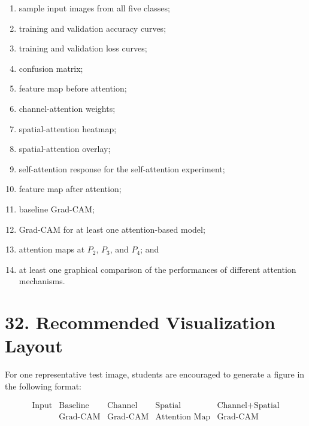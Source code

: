\documentclass[10pt]{article}
\begin{document}
\begin{enumerate}

\item sample input images from all five classes;

\item training and validation accuracy curves;

\item training and validation loss curves;

\item confusion matrix;

\item feature map before attention;

\item channel-attention weights;

\item spatial-attention heatmap;

\item spatial-attention overlay;

\item self-attention response for the self-attention experiment;

\item feature map after attention;

\item baseline Grad-CAM;

\item Grad-CAM for at least one attention-based model;

\item attention maps at $P_2$, $P_3$, and $P_4$; and

\item at least one graphical comparison of the performances of different
attention mechanisms.

\end{enumerate}

\section*{32. Recommended Visualization Layout}

For one representative test image, students are encouraged to generate a
figure in the following format:

\[
\boxed{
\begin{array}{ccccc}
\text{Input}
&
\text{Baseline}
&
\text{Channel}
&
\text{Spatial}
&
\text{Channel+Spatial}
\\
&
\text{Grad-CAM}
&
\text{Grad-CAM}
&
\text{Attention Map}
&
\text{Grad-CAM}
\end{array}
}
\]
\end{document}
